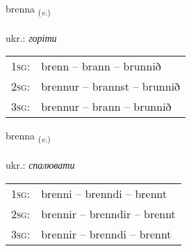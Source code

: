 \documentclass[frontgrid, backgrid]{flacards}\usepackage[]{graphicx}\usepackage[]{xcolor}
\begin{document}
\renewcommand{\flhead}{\vskip5pt \fboxsep=0pt {\small\bfseries\footnotesize Sagnorð | дієслово}}
\renewcommand{\fcfoot}{\vskip5pt \fboxsep=0pt \hspace{2pt}{\small\bfseries\footnotesize 2K}}

\renewcommand{\blhead}{\vskip5pt {\small\bfseries\footnotesize Sagnorð | дієслово }}
\renewcommand{\bcfoot}{\vskip5pt \hspace{2pt}{\small\bfseries\footnotesize 2K}}


{brenna \small{\textsubscript{(\textit{v.})}} \\[1ex] %
\textphonetic{[prɛna]} \\
ukr.: \emph{горіти} \\  [2ex]
\renewcommand*{\arraystretch}{0.8}
\begin{tabular}{p{1cm}l}
\textsc{1sg}: & brenn -- brann -- brunnið \\ 
\textsc{2sg}: & brennur -- brannst -- brunnið \\ 
\textsc{3sg}: & brennur -- brann -- brunnið \\ 
\end{tabular}
}

\renewcommand{\flhead}{\vskip5pt \fboxsep=0pt {\small\bfseries\footnotesize Sagnorð | дієслово}}
\renewcommand{\fcfoot}{\vskip5pt \fboxsep=0pt \hspace{2pt}{\small\bfseries\footnotesize 2K}}

\renewcommand{\blhead}{\vskip5pt {\small\bfseries\footnotesize Sagnorð | дієслово }}
\renewcommand{\bcfoot}{\vskip5pt \hspace{2pt}{\small\bfseries\footnotesize 2K}}


{brenna \small{\textsubscript{(\textit{v.})}} \\[1ex] %
\textphonetic{[prɛna]} \\
ukr.: \emph{спалювати} \\  [2ex]
\renewcommand*{\arraystretch}{0.8}
\begin{tabular}{p{1cm}l}
\textsc{1sg}: & brenni -- brenndi -- brennt \\ 
\textsc{2sg}: & brennir -- brenndir -- brennt \\ 
\textsc{3sg}: & brennir -- brenndi -- brennt \\ 
\end{tabular}
}
\end{document}
